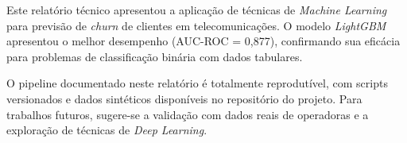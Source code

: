 \documentclass[
    article,
    12pt,
    oneside,
    a4paper,
    english,
    brazilian
    ]{abntex2}
\numberwithin{equation}{section}
\begin{document}
Este relatório técnico apresentou a aplicação de técnicas de \textit{Machine Learning} para previsão de \textit{churn} de clientes em telecomunicações. O modelo \textit{LightGBM} apresentou o melhor desempenho (AUC-ROC = 0,877), confirmando sua eficácia para problemas de classificação binária com dados tabulares.

O pipeline documentado neste relatório é totalmente reprodutível, com scripts versionados e dados sintéticos disponíveis no repositório do projeto. Para trabalhos futuros, sugere-se a validação com dados reais de operadoras e a exploração de técnicas de \textit{Deep Learning}.



\end{document}
